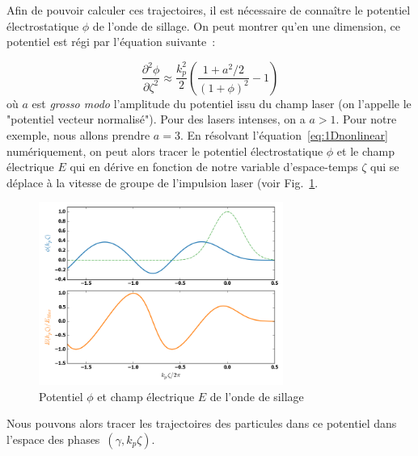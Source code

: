 \documentclass[a4paper]{book}
\begin{document}
Afin de pouvoir calculer ces trajectoires, il est nécessaire de connaître le potentiel électrostatique $\phi$ de l'onde de sillage. On peut montrer qu'en une dimension, ce potentiel est régi par l'équation suivante~:

\begin{equation}
    \frac{\partial^2 \phi}{\partial \zeta ^2 }\approx\frac{k_p^2}{2}\left(\frac{1+a^2/2}{(1+\phi)^2}-1\right)
    \label{eq:1Dnonlinear}
\end{equation}
où $a$ est \textit{grosso modo} l'amplitude du potentiel issu du champ laser (on l'appelle le "potentiel vecteur normalisé"). Pour des lasers intenses, on a $a>1$. Pour notre exemple, nous allons prendre $a=3$. En résolvant l'équation~\ref{eq:1Dnonlinear} numériquement, on peut alors tracer le potentiel électrostatique $\phi$ et le champ électrique $E$ qui en dérive en fonction de notre variable d'espace-temps $\zeta$ qui se déplace à la vitesse de groupe de l'impulsion laser (voir Fig.~\ref{fig:1D_pot_field}. 


\begin{figure}[!htbp]
\begin{center}
\includegraphics[width=8cm]{1D_Field_and_Potential.png}
\end{center}
\caption{Potentiel $\phi$ et champ électrique $E$ de l'onde de sillage}
\label{fig:1D_pot_field}
\end{figure}

Nous pouvons alors tracer les trajectoires des particules dans ce potentiel dans l'espace des phases~$(\gamma, k_p\zeta)$.
\end{document}
